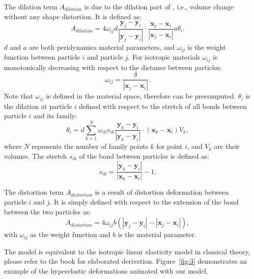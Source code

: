 The dilation term $A_{dilation}$ is due to the dilation part of , i.e., volume change without any shape distortion. It is defined as:
\begin{equation}
A_{dilation}=4\omega_{ij}d\frac{\mathbf{y}_j-\mathbf{y}_i}{|\mathbf{y}_j-\mathbf{y}_i|}\cdot\frac{\mathbf{x}_j-\mathbf{x}_i}{|\mathbf{x}_j-\mathbf{x}_i|}a\theta_i.
\label{eq:3}
\end{equation}
$d$ and $a$ are both peridynamics material parameters, and $\omega_{ij}$ is the weight function between particle $i$ and particle $j$. For isotropic materials $\omega_{ij}$ is monotonically decreasing with respect to the distance between particles:
\begin{equation}
\omega_{ij} = \frac{\delta}{|\mathbf{x}_j-\mathbf{x}_i|}.
\label{eq:3}
\end{equation}
Note that $\omega_{ij}$ is defined in the material space, therefore can be precomputed. $\theta_i$ is the dilation at particle $i$ defined with respect to the stretch of all bonds between particle $i$ and its family:
\begin{equation}
\theta_i = d\sum_{k=1}^N\omega_{ik}s_{ik}\frac{\mathbf{y}_k-\mathbf{y}_i}{|\mathbf{y}_k-\mathbf{y}_i|}\cdot(\mathbf{x}_k-\mathbf{x}_i)V_k,
\label{eq:4}
\end{equation}
where $N$ represents the number of family points $k$ for point $i$, and $V_k$ are their volumes. The stretch $s_{ik}$ of the bond  between particles is defined as:
\begin{equation}
s_{ik}=\frac{|\mathbf{y}_k-\mathbf{y}_i|}{|\mathbf{x}_k-\mathbf{x}_i|} -1.
\label{eq:5}
\end{equation}

The distortion term $A_{distortion}$ is a result of distortion deformation between particle $i$ and $j$. It is simply defined with respect to the extension of the bond between the two particles as:
\begin{equation}
A_{distortion}=4\omega_{ij}b(|\mathbf{y}_j-\mathbf{y}_i|-|\mathbf{x}_j-\mathbf{x}_i|),
\label{eq:6}
\end{equation}
with $\omega_{ij}$ as the weight function and $b$ is the material parameter.

The model is equivalent to the isotropic linear elasticity model in classical theory, please refer to the book\cite{madenci2014peridynamic} for elaborated derivation. Figure~\ref{fig:3} demonstrates an example of the hyperelastic deformations animated with our model.

